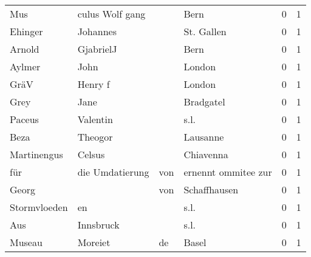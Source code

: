 \begin{tabular}{llllrr}
                      Mus &                    culus Wolf gang &             &                                        Bern &          0 &         1 \\
                  Ehinger &                           Johannes &             &                                  St. Gallen &          0 &         1 \\
                   Arnold &                          GjabrielJ &             &                                        Bern &          0 &         1 \\
                   Aylmer &                               John &             &                                      London &          0 &         1 \\
                     GräV &                            Henry f &             &                                      London &          0 &         1 \\
                     Grey &                               Jane &             &                                   Bradgatel &          0 &         1 \\
                   Paceus &                           Valentin &             &                                        s.l. &          0 &         1 \\
                     Beza &                            Theogor &             &                                    Lausanne &          0 &         1 \\
              Martinengus &                             Celsus &             &                                   Chiavenna &          0 &         1 \\
                      für &                    die Umdatierung &         von &                         ernennt ommitee zur &          0 &         1 \\
                    Georg &                                    &         von &                                Schaffhausen &          0 &         1 \\
             Stormvloeden &                                 en &             &                                        s.l. &          0 &         1 \\
                      Aus &                          Innsbruck &             &                                        s.l. &          0 &         1 \\
                   Museau &                            Moreiet &          de &                                       Basel &          0 &         1 \\

\end{tabular}
